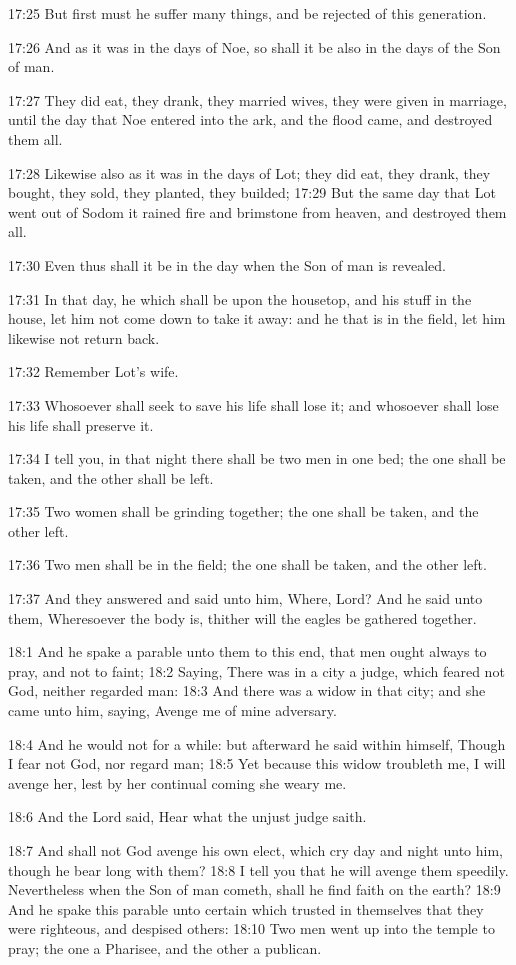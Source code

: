 17:25 But first must he suffer many things, and be rejected of this
generation.

17:26 And as it was in the days of Noe, so shall it be also in the
days of the Son of man.

17:27 They did eat, they drank, they married wives, they were given in
marriage, until the day that Noe entered into the ark, and the flood
came, and destroyed them all.

17:28 Likewise also as it was in the days of Lot; they did eat, they
drank, they bought, they sold, they planted, they builded; 17:29 But
the same day that Lot went out of Sodom it rained fire and brimstone
from heaven, and destroyed them all.

17:30 Even thus shall it be in the day when the Son of man is
revealed.

17:31 In that day, he which shall be upon the housetop, and his stuff
in the house, let him not come down to take it away: and he that is in
the field, let him likewise not return back.

17:32 Remember Lot's wife.

17:33 Whosoever shall seek to save his life shall lose it; and
whosoever shall lose his life shall preserve it.

17:34 I tell you, in that night there shall be two men in one bed; the
one shall be taken, and the other shall be left.

17:35 Two women shall be grinding together; the one shall be taken,
and the other left.

17:36 Two men shall be in the field; the one shall be taken, and the
other left.

17:37 And they answered and said unto him, Where, Lord? And he said
unto them, Wheresoever the body is, thither will the eagles be
gathered together.

18:1 And he spake a parable unto them to this end, that men ought
always to pray, and not to faint; 18:2 Saying, There was in a city a
judge, which feared not God, neither regarded man: 18:3 And there was
a widow in that city; and she came unto him, saying, Avenge me of mine
adversary.

18:4 And he would not for a while: but afterward he said within
himself, Though I fear not God, nor regard man; 18:5 Yet because this
widow troubleth me, I will avenge her, lest by her continual coming
she weary me.

18:6 And the Lord said, Hear what the unjust judge saith.

18:7 And shall not God avenge his own elect, which cry day and night
unto him, though he bear long with them?  18:8 I tell you that he will
avenge them speedily. Nevertheless when the Son of man cometh, shall
he find faith on the earth?  18:9 And he spake this parable unto
certain which trusted in themselves that they were righteous, and
despised others: 18:10 Two men went up into the temple to pray; the
one a Pharisee, and the other a publican.

